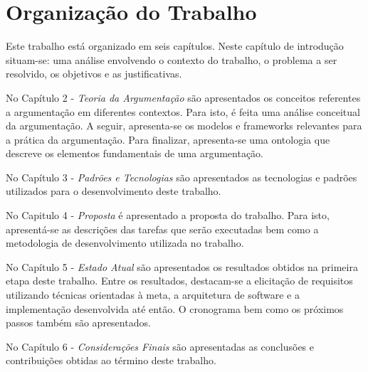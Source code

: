 \section{Organização do Trabalho}

Este trabalho está organizado em seis capítulos. Neste capítulo de introdução situam-se: uma análise envolvendo o contexto do trabalho, o problema a ser resolvido, os objetivos e as justificativas.

No Capítulo 2 - \textit{Teoria da Argumentação} são apresentados os conceitos referentes a argumentação em diferentes contextos. Para isto, é feita uma análise conceitual da argumentação. A seguir, apresenta-se os modelos e frameworks relevantes para a prática da argumentação. Para finalizar, apresenta-se uma ontologia que descreve os elementos fundamentais de uma argumentação.

No Capítulo 3 - \textit{Padrões e Tecnologias} são apresentados as tecnologias e padrões utilizados para o desenvolvimento deste trabalho.

No Capitulo 4 - \textit{Proposta} é apresentado a proposta do trabalho. Para isto, apresentá-se as descrições das tarefas que serão executadas bem como a metodologia de desenvolvimento utilizada no trabalho.

No Capítulo 5 - \textit{Estado Atual} são apresentados os resultados obtidos na primeira etapa deste trabalho. Entre os resultados, destacam-se a elicitação de requisitos utilizando técnicas orientadas à meta, a arquitetura de software e a implementação desenvolvida até então. O cronograma bem como os próximos passos também são apresentados.

No Capítulo 6 - \textit{Considerações Finais} são apresentadas as conclusões e contribuições obtidas ao término deste trabalho.














